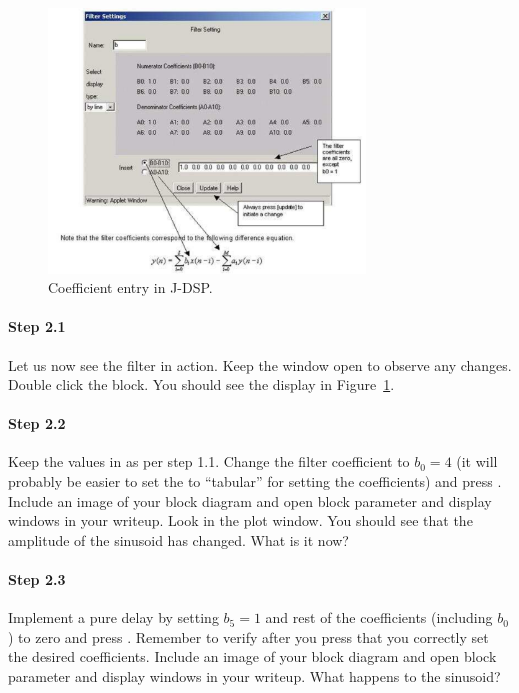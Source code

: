 \begin{figure}
\begin{center}
\includegraphics[width=0.75\textwidth]{lab1/image022}
\end{center}
\caption{Coefficient entry in J-DSP.\label{fg:coef-entry}}
\end{figure}

\paragraph{Step 2.1} Let us now see the filter in action. Keep the
 window open to observe any changes. Double click the
 block. You should see the display in
Figure~\ref{fg:coef-entry}.

\paragraph{Step 2.2} Keep the values in  as per step
1.1. Change the filter coefficient to $b_0=4$ (it will probably be
easier to set the  to ``tabular'' for setting the
coefficients) and press . Include an image of your
block diagram and open block parameter and display windows in your
writeup. Look in the plot window. You should see that the amplitude of
the sinusoid has changed. What is it now?


\paragraph{Step 2.3} Implement a pure delay by setting $b_5=1$ and
rest of the coefficients (including $b_0$) to zero and press
. Remember to verify after you press 
that you correctly set the desired coefficients. Include an image of
your block diagram and open block parameter and display windows in
your writeup. What happens to the sinusoid?


